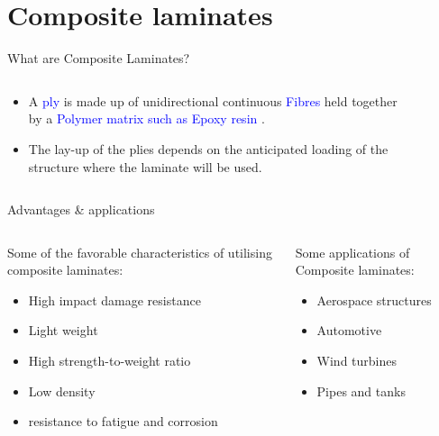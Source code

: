 \documentclass[10pt,aspectratio=169,dvipsnames]{beamer} %
\begin{document}
\section{Composite laminates}
\begin{frame}{What are Composite Laminates?}
	\begin{columns}[T]
	\begin{column}[c]{.3\textwidth}
		\small
		\begin{itemize}
			\item A \textcolor{blue}{ply} is made up of unidirectional continuous \textcolor{blue}{Fibres} held together by a \textcolor{blue}{Polymer matrix such as Epoxy resin} .			
			\item The lay-up of the plies depends on the anticipated loading of the structure where the laminate will be used.
		\end{itemize}
	\end{column}
	\hfill
	\begin{column}[c]{.65\textwidth}
		\begin{figure}
		\end{figure}
	\end{column}
	\end{columns}	
\end{frame}
\begin{frame}{Advantages \& applications}
	\begin{columns}[T]
		\begin{column}[c]{.48\textwidth}
			Some of the favorable characteristics of utilising composite laminates:
			\begin{itemize}
				\item {High impact damage resistance}
				\item {Light weight}
				\item {High strength-to-weight ratio}
				\item {Low density}
				\item {resistance to fatigue and corrosion}
			\end{itemize}
		\end{column}		
		\begin{column}[c]{.48\textwidth}
			Some applications of Composite laminates:
			\begin{itemize}
				\item Aerospace structures
				\item Automotive
				\item Wind turbines
				\item Pipes and tanks
			\end{itemize}
		\end{column}
	\end{columns}	
\end{frame}
\end{document}
